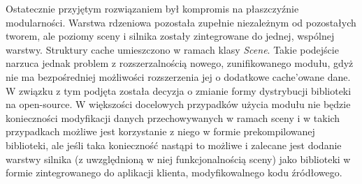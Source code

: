 Ostatecznie przyjętym rozwiązaniem był kompromis na płaszczyźnie modularności. Warstwa rdzeniowa pozostała zupełnie niezależnym od pozostałych tworem, ale poziomy sceny i silnika zostały zintegrowane do jednej, wspólnej warstwy. Struktury cache umieszczono w ramach klasy \textit{Scene}. Takie podejście narzuca jednak problem z rozszerzalnością nowego, zunifikowanego modułu, gdyż nie ma bezpośredniej możliwości rozszerzenia jej o dodatkowe cache'owane dane. W związku z tym podjęta została decyzja o zmianie formy dystrybucji biblioteki na open-source. W większości docelowych przypadków użycia modułu nie będzie konieczności modyfikacji danych przechowywanych w ramach sceny i w takich przypadkach możliwe jest korzystanie z niego w formie prekompilowanej biblioteki, ale jeśli taka konieczność nastąpi to możliwe i zalecane jest dodanie warstwy silnika (z uwzględnioną w niej funkcjonalnością sceny) jako biblioteki w formie zintegrowanego do aplikacji klienta, modyfikowalnego kodu źródłowego. 